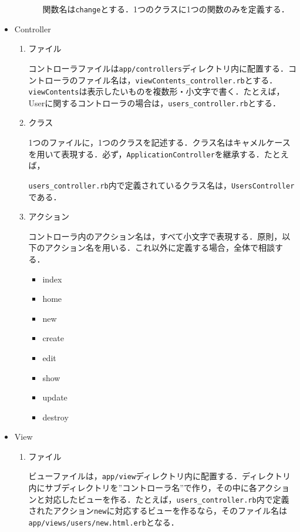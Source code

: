 \begin{itemize}
\begin{enumerate}
\begin{enumerate}
				            関数名は\texttt{change}とする．1つのクラスに1つの関数のみを定義する．
		            \end{enumerate}
	      \end{enumerate}

	\item Controller
	      \begin{enumerate}
		      \item ファイル

		            コントローラファイルは\texttt{app/controllers}ディレクトリ内に配置する．コントローラのファイル名は，\texttt{viewContents\_controller.rb}とする．\texttt{viewContents}は表示したいものを複数形・小文字で書く．たとえば，Userに関するコントローラの場合は，\texttt{users\_controller.rb}とする．
		      \item クラス

		            1つのファイルに，1つのクラスを記述する．クラス名はキャメルケースを用いて表現する．必ず，\texttt{ApplicationController}を継承する．たとえば，

		            \texttt{users\_controller.rb}内で定義されているクラス名は，\texttt{UsersController}である．
		      \item アクション

		            コントローラ内のアクション名は，すべて小文字で表現する．原則，以下のアクション名を用いる．これ以外に定義する場合，全体で相談する．
		            \begin{itemize}
			            \item index
			            \item home
			            \item new
			            \item create
			            \item edit
			            \item show
			            \item update
			            \item destroy
		            \end{itemize}
	      \end{enumerate}
	\item View
	      \begin{enumerate}
		      \item ファイル

		            ビューファイルは，\texttt{app/view}ディレクトリ内に配置する．ディレクトリ内にサブディレクトリを”コントローラ名”で作り，その中に各アクションと対応したビューを作る．たとえば，\texttt{users\_controller.rb}内で定義されたアクション\texttt{new}に対応するビューを作るなら，そのファイル名は\texttt{app/views/users/new.html.erb}となる．
	      \end{enumerate}
\end{itemize}

